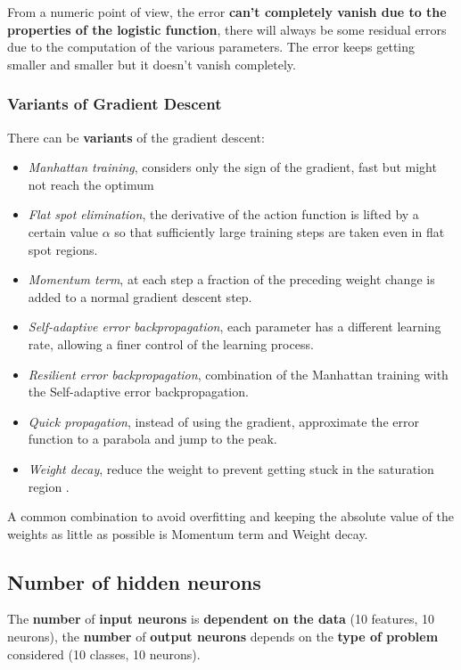 From a numeric point of view, the error \textbf{can't completely vanish due to the properties of the logistic function}, there will always be some residual errors due to the computation of the various parameters. The error keeps getting smaller and smaller but it doesn't vanish completely.\\

\newpage

\subsubsection{Variants of Gradient Descent}
There can be \textbf{variants} of the gradient descent: 
\begin{itemize}
	\item \textit{Manhattan training}, considers only the sign of the gradient, fast but might not reach the optimum
	\item \textit{Flat spot elimination}, the derivative of the action function is lifted by a certain value $\alpha$ so that sufficiently large training steps are taken even in flat spot regions.\\
	\item \textit{Momentum term}, at each step a fraction of the preceding weight change is added to a normal gradient descent step.\\
	\item \textit{Self-adaptive error backpropagation}, each parameter has a different learning rate, allowing a finer control of the learning process.\\
	\item \textit{Resilient error backpropagation}, combination of the Manhattan training with the Self-adaptive error backpropagation.\\
	\item \textit{Quick propagation}, instead of using the gradient, approximate the error function to a parabola and jump to the peak.\\
	\item \textit{Weight decay}, reduce the weight to prevent getting stuck in the saturation region .\\
\end{itemize}
A common combination to avoid overfitting and keeping the absolute value of the weights as little as possible is Momentum term and Weight decay.\\

\newpage

\subsection{Number of hidden neurons}
The \textbf{number} of \textbf{input neurons} is \textbf{dependent on the data} (10 features, 10 neurons), the \textbf{number} of \textbf{output neurons} depends on the \textbf{type of problem} considered (10 classes, 10 neurons).\\


